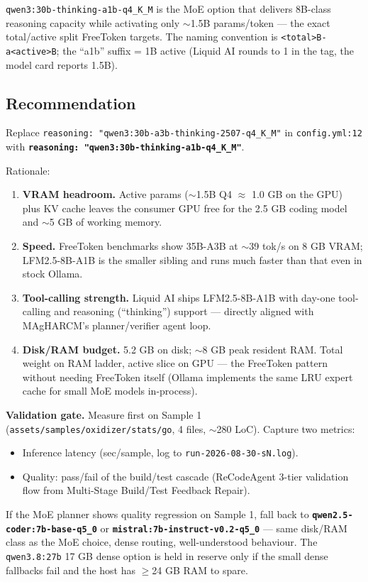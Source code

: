 \texttt{qwen3:30b-thinking-a1b-q4\_K\_M} is the MoE option that delivers 8B-class
reasoning capacity while activating only $\sim$1.5B params/token --- the exact
total/active split FreeToken targets. The naming convention is
\texttt{<total>B-a<active>B}; the ``a1b'' suffix = 1B active (Liquid AI rounds
to 1 in the tag, the model card reports 1.5B).

\subsection{Recommendation}

Replace \texttt{reasoning: "qwen3:30b-a3b-thinking-2507-q4_K_M"} in \texttt{config.yml:12} with
\textbf{\texttt{reasoning: "qwen3:30b-thinking-a1b-q4\_K\_M"}}.

Rationale:
\begin{enumerate}
\item \textbf{VRAM headroom.} Active params ($\sim$1.5B Q4 $\approx$ 1.0 GB on
  the GPU) plus KV cache leaves the consumer GPU free for the 2.5 GB coding
  model and $\sim$5 GB of working memory.
\item \textbf{Speed.} FreeToken benchmarks show 35B-A3B at $\sim$39 tok/s on
  8 GB VRAM; LFM2.5-8B-A1B is the smaller sibling and runs much faster than that
  even in stock Ollama.
\item \textbf{Tool-calling strength.} Liquid AI ships LFM2.5-8B-A1B with
  day-one tool-calling and reasoning (``thinking'') support --- directly aligned
  with MAgHARCM's planner/verifier agent loop.
\item \textbf{Disk/RAM budget.} 5.2 GB on disk; $\sim$8 GB peak resident RAM.
  Total weight on RAM ladder, active slice on GPU --- the FreeToken pattern
  without needing FreeToken itself (Ollama implements the same LRU expert cache
  for small MoE models in-process).
\end{enumerate}

\textbf{Validation gate.} Measure first on Sample 1
(\texttt{assets/samples/oxidizer/stats/go}, 4 files, $\sim$280 LoC). Capture
two metrics:
\begin{itemize}
\item Inference latency (sec/sample, log to \texttt{run-2026-08-30-sN.log}).
\item Quality: pass/fail of the build/test cascade (ReCodeAgent 3-tier
  validation flow from Multi-Stage Build/Test Feedback Repair).
\end{itemize}

If the MoE planner shows quality regression on Sample 1, fall back to
\textbf{\texttt{qwen2.5-coder:7b-base-q5\_0}} or
\textbf{\texttt{mistral:7b-instruct-v0.2-q5\_0}} --- same disk/RAM class as the
MoE choice, dense routing, well-understood behaviour. The \texttt{qwen3.8:27b}
17 GB dense option is held in reserve only if the small dense fallbacks fail and
the host has $\geq$24 GB RAM to spare.

